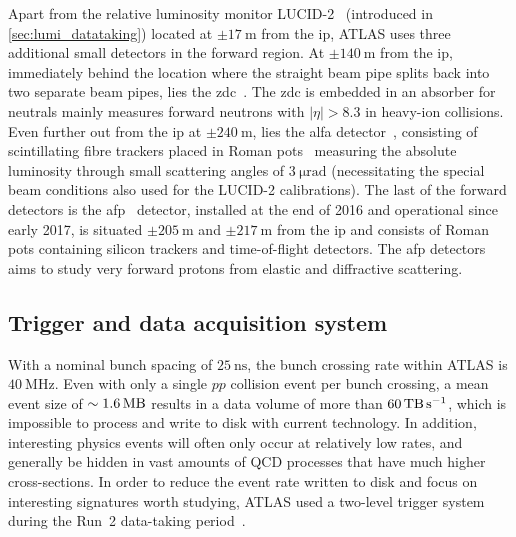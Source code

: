 Apart from the relative luminosity monitor LUCID-2~\cite{Avoni_2018} (introduced in \cref{sec:lumi_datataking}) located at $\pm \SI{17}{\meter}$ from the \gls{ip}, ATLAS uses three additional small detectors in the forward region. At $\pm \SI{140}{\meter}$ from the \gls{ip}, immediately behind the location where the straight beam pipe splits back into two separate beam pipes, lies the \gls{zdc}~\cite{Leite:1628749}. The \gls{zdc} is embedded in an absorber for neutrals mainly measures forward neutrons with $\vert\eta\vert > 8.3$ in heavy-ion collisions. Even further out from the \gls{ip} at $\pm \SI{240}{\meter}$, lies the \gls{alfa} detector~\cite{AbdelKhalek:2016tiv}, consisting of scintillating fibre trackers placed in Roman pots~\cite{AMALDI1977390} measuring the absolute luminosity through small scattering angles of $\SI{3}{\micro\radian}$ (necessitating the special beam conditions also used for the LUCID-2 calibrations). The last of the forward detectors is the \gls{afp}~\cite{Adamczyk:2017378} detector, installed at the end of 2016 and operational since early 2017, is situated $\pm\SI{205}{\meter}$ and $\pm\SI{217}{\meter}$ from the \gls{ip} and consists of Roman pots containing silicon trackers and time-of-flight detectors. The \gls{afp} detectors aims to study very forward protons from elastic and diffractive scattering.

\subsection{Trigger and data acquisition system}

With a nominal bunch spacing of $\SI{25}{\nano\second}$, the bunch crossing rate within ATLAS is $\SI{40}{\MHz}$. Even with only a single $pp$ collision event per bunch crossing, a mean event size of $\sim \SI{1.6}{\mega\byte}$ results in a data volume of more than $\SI{60}{\tera\byte\per\second}$, which is impossible to process and write to disk with current technology. In addition, interesting physics events will often only occur at relatively low rates, and generally be hidden in vast amounts of QCD processes that have much higher cross-sections. In order to reduce the event rate written to disk and focus on interesting signatures worth studying, ATLAS used a two-level trigger system during the Run~2 data-taking period~\cite{Martinez:2016udm}. 

